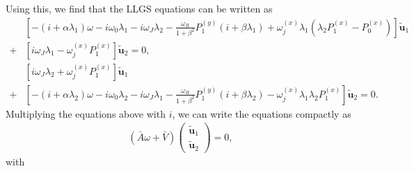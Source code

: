 Using this, we find that the LLGS equations can be written as
\begin{subequations}
\begin{align}
    \nonumber&\left[-(i+\alpha\lambda_1)\omega - i\omega_0\lambda_1 - i\omega_J\lambda_2 -\frac{\omega_R}{1+\beta^2}P^{(y)}_1(i+\beta\lambda_1) + \omega^{(x)}_j\lambda_1(\lambda_2P^{(x)}_1 - P^{(x)}_0)\right]\tilde{\mathbold{u}}_1 \\
    + &\left[ i\omega_J\lambda_1 - \omega^{(x)}_jP^{(x)}_1 \right]\tilde{\mathbold{u}}_2 = 0, \\
    \nonumber&\left[i\omega_J\lambda_2 + \omega^{(x)}_jP^{(x)}_1\right]\tilde{\mathbold{u}}_1 \\
    + &\left[-(i+\alpha\lambda_2)\omega - i\omega_0\lambda_2 - i\omega_J\lambda_1 -\frac{\omega_R}{1+\beta^2}P^{(y)}_1(i+\beta\lambda_2) - \omega^{(x)}_j\lambda_1\lambda_2P^{(x)}_1 \right]\tilde{\mathbold{u}}_2 = 0.
\end{align}
\end{subequations}
Multiplying the equations above with $i$, we can write the equations compactly as
\begin{align}
    \label{eq:EigenvalueEqn_app}
    \left(\bar{A}\omega + \bar{V}\right)
    \begin{pmatrix}
     \tilde{\mathbold{u}}_1 \\
     \tilde{\mathbold{u}}_2
    \end{pmatrix}
    = 0,
\end{align}
with
